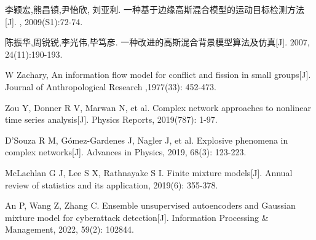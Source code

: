 \documentclass[a4paper,12pt,openany,oneside,utf-8]{ctexbook}
\newcommand{\sanhao}{\fontsize{15.75pt}{\baselineskip}\selectfont}
\begin{document}
\begin{spacing}{1.2}
\begin{thebibliography}{1}
            李颖宏,熊昌镇,尹怡欣, 刘亚利.
            \newblock 一种基于边缘高斯混合模型的运动目标检测方法[J].
            ,{ 2009(S1):72-74}.
            
            陈振华,周锐锐,李光伟,毕笃彦.
            \newblock 一种改进的高斯混合背景模型算法及仿真[J].
             {2007}, {24(11):190-193}.
            
            
            W Zachary, An information flow model for conflict and fission in small groups[J]. Journal of Anthropological Research ,1977(33): 452-473.

            Zou Y, Donner R V, Marwan N, et al. Complex network approaches to nonlinear time series analysis[J]. Physics Reports, 2019(787): 1-97.

            D'Souza R M, Gómez-Gardenes J, Nagler J, et al. Explosive phenomena in complex networks[J]. Advances in Physics, 2019, 68(3): 123-223.

            McLachlan G J, Lee S X, Rathnayake S I. Finite mixture models[J]. Annual review of statistics and its application, 2019(6): 355-378.

            An P, Wang Z, Zhang C. Ensemble unsupervised autoencoders and Gaussian mixture model for cyberattack detection[J]. Information Processing {\&} Management, 2022, 59(2): 102844.
            
		\end{thebibliography}
	\end{spacing}
  
\newpage
	
	
	
	
	    
\end{document}
